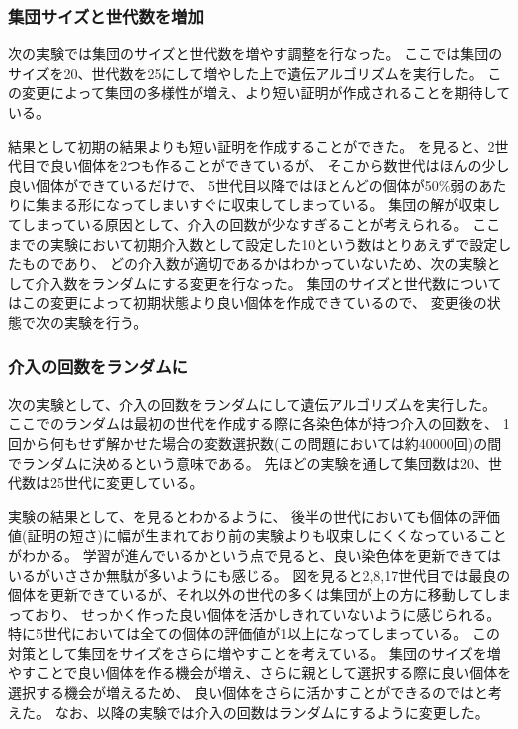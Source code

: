 \subsubsection{集団サイズと世代数を増加}

次の実験では集団のサイズと世代数を増やす調整を行なった。
ここでは集団のサイズを20、世代数を25にして増やした上で遺伝アルゴリズムを実行した。
この変更によって集団の多様性が増え、より短い証明が作成されることを期待している。


結果として初期の結果よりも短い証明を作成することができた。
を見ると、2世代目で良い個体を2つも作ることができているが、
そこから数世代はほんの少し良い個体ができているだけで、
5世代目以降ではほとんどの個体が50\%弱のあたりに集まる形になってしまいすぐに収束してしまっている。
集団の解が収束してしまっている原因として、介入の回数が少なすぎることが考えられる。
ここまでの実験において初期介入数として設定した10という数はとりあえずで設定したものであり、
どの介入数が適切であるかはわかっていないため、次の実験として介入数をランダムにする変更を行なった。
集団のサイズと世代数についてはこの変更によって初期状態より良い個体を作成できているので、
変更後の状態で次の実験を行う。



\subsubsection{介入の回数をランダムに}

次の実験として、介入の回数をランダムにして遺伝アルゴリズムを実行した。
ここでのランダムは最初の世代を作成する際に各染色体が持つ介入の回数を、
1回から何もせず解かせた場合の変数選択数(この問題においては約40000回)の間でランダムに決めるという意味である。
先ほどの実験を通して集団数は20、世代数は25世代に変更している。


実験の結果として、を見るとわかるように、
後半の世代においても個体の評価値(証明の短さ)に幅が生まれており前の実験よりも収束しにくくなっていることがわかる。
学習が進んでいるかという点で見ると、良い染色体を更新できてはいるがいささか無駄が多いようにも感じる。
図を見ると2,8,17世代目では最良の個体を更新できているが、それ以外の世代の多くは集団が上の方に移動してしまっており、
せっかく作った良い個体を活かしきれていないように感じられる。
特に5世代においては全ての個体の評価値が1以上になってしまっている。
この対策として集団をサイズをさらに増やすことを考えている。
集団のサイズを増やすことで良い個体を作る機会が増え、さらに親として選択する際に良い個体を選択する機会が増えるため、
良い個体をさらに活かすことができるのではと考えた。
なお、以降の実験では介入の回数はランダムにするように変更した。

